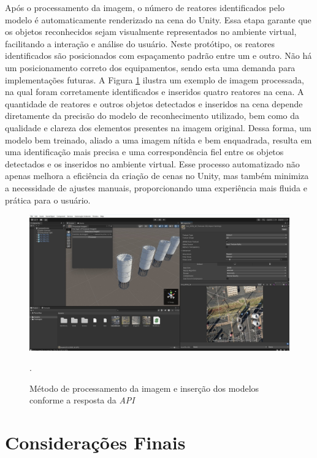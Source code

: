 Após o processamento da imagem, o número de reatores identificados pelo modelo é automaticamente renderizado na cena do Unity. Essa etapa garante que os objetos reconhecidos sejam visualmente representados no ambiente virtual, facilitando a interação e análise do usuário. Neste protótipo, os reatores identificados são posicionados com espaçamento padrão entre um e outro. Não há um posicionamento correto dos equipamentos, sendo esta uma demanda para implementações futuras. A Figura \ref{fig:predict} ilustra um exemplo de imagem processada, na qual foram corretamente identificados e inseridos quatro reatores na cena. A quantidade de reatores e outros objetos detectados e inseridos na cena depende diretamente da precisão do modelo de reconhecimento utilizado, bem como da qualidade e clareza dos elementos presentes na imagem original. Dessa forma, um modelo bem treinado, aliado a uma imagem nítida e bem enquadrada, resulta em uma identificação mais precisa e uma correspondência fiel entre os objetos detectados e os inseridos no ambiente virtual. Esse processo automatizado não apenas melhora a eficiência da criação de cenas no Unity, mas também minimiza a necessidade de ajustes manuais, proporcionando uma experiência mais fluida e prática para o usuário.

\begin{figure}[!h]
    \centering
    \begin{minipage}{0.9\linewidth}
    \centering
    \captionsetup{justification=centering,margin=0.5cm,font=small}
    \includegraphics[width=1\linewidth]{img/cap5/predict.jpeg}
    \caption{Método de processamento da imagem e inserção dos modelos conforme a resposta da \textit{API}}.
    \label{fig:predict}
    \end{minipage}
\end{figure}

\section{Considerações Finais}

